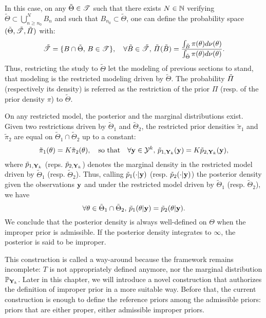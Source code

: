 In this case, on any $\tilde\Theta\in\mathscr{T}$ such that there exists $N\in\mathbb{N}$ verifying $\tilde\Theta\subset\bigcup_{n\geq n_0}^NB_n$ and such that $B_{n_0}\subset\tilde\Theta$, one can define the probability space $(\tilde\Theta,\tilde{\mathscr{T}},\tilde\varPi)$ with:
    \begin{equation}
        \tilde{\mathscr{T}} = \{B\cap\tilde\Theta,\,B\in\mathscr{T}\},\quad\forall \tilde B\in\tilde{\mathscr{T}},\,\tilde\varPi(\tilde B) = \frac{\int_{\tilde B}\pi(\theta)d\nu(\theta)}{\int_{\tilde\Theta}\pi(\theta)d\nu(\theta)}.
    \end{equation}
Thus, restricting the study to $\tilde\Theta$ let the modeling of previous sections to stand, that modeling is the restricted modeling driven by $\tilde\Theta$. 
The probability $\Tilde\varPi$ (respectively its density) is referred as the restriction of the prior $\varPi$ (resp. of the prior density $\pi$) to $\tilde\Theta$.

On any restricted model, the posterior and the marginal distributions exist. 
Given two restrictions driven by $\tilde\Theta_1$ and $\tilde\Theta_2$, the restricted prior densities $\tilde\pi_1$ and $\tilde\pi_2$ are equal on $\tilde\Theta_1\cap\tilde\Theta_2$ up to a constant:
    \begin{equation}
        \tilde\pi_1(\theta) = K\tilde\pi_2(\theta),\quad\text{so that}\quad \forall \mathbf{y}\in\mathcal{Y}^k,\,\tilde p_{1,\mathbf{Y}_k}(\mathbf{y}) = K\tilde p_{2,\mathbf{Y}_k}(\mathbf{y}),
    \end{equation}
where $\tilde p_{1,\mathbf{Y}_k}$ (reps. $\tilde p_{2,\mathbf{Y}_k}$) denotes the marginal density in the restricted model driven by $\tilde\Theta_1$ (resp. $\tilde\Theta_2$). Thus, calling $\tilde p_1(\cdot | \mathbf{y})$ (resp. $\tilde p_2(\cdot | \mathbf{y})$) the posterior density given the observations $\mathbf{y}$ and under the restricted model driven by $\tilde\Theta_1$ (resp. $\tilde\Theta_2$), we have
    \begin{equation}
        \forall\theta\in\tilde\Theta_1\cap\tilde\Theta_2,\, \tilde p_1(\theta | \mathbf{y}) =\tilde p_2(\theta | \mathbf{y}).
    \end{equation}
We conclude that the posterior density is always well-defined on $\Theta$ when the improper prior is admissible.
If the posterior density integrates to $\infty$, the posterior is said to be improper.



This construction is called a way-around because the framework remains incomplete: $T$ is not appropriately defined anymore, nor the marginal distribution $\mathbb{P}_{\mathbf{Y}_k}$. Later in this chapter, we will introduce a novel construction that authorizes the definition of improper prior in a more suitable way.
Before that, the current construction is enough to define the reference priors among the admissible priors: priors that are either proper, either admissible improper priors.


